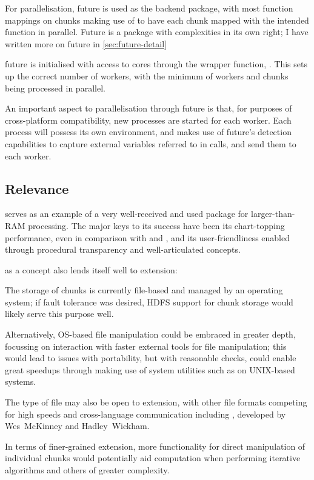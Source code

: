 For parallelisation, future is used as the backend package, with most function mappings on chunks making use of  to have each chunk mapped with the intended function in parallel.
Future is a package with complexities in its own right; I have written more on future in \cref{sec:future-detail}

future is initialised with access to cores through the wrapper function, \cite{zj19:_key}.
This sets up the correct number of workers, with the minimum of workers and chunks being processed in parallel.

An important aspect to parallelisation through future is that, for purposes of cross-platform compatibility, new \R{} processes are started for each worker\cite{zj19:_using}.
Each process will possess its own environment, and  makes use of future's detection capabilities to capture external variables referred to in calls, and send them to each worker.

\subsection{Relevance}\label{sec:relevance}

 serves as an example of a very well-received and used package
for larger-than-RAM processing.
The major keys to its success have been its chart-topping performance, even in comparison with  and , and its user-friendliness enabled through procedural transparency and well-articulated concepts.

 as a concept also lends itself well to extension:

The storage of chunks is currently file-based and managed by an operating system; if fault tolerance was desired, HDFS support for chunk storage would likely serve this purpose well.

Alternatively, OS-based file manipulation could be embraced in greater depth, focussing on interaction with faster external tools for file manipulation; this would lead to issues with portability, but with reasonable checks, could enable great speedups through making use of system utilities such as  on UNIX-based systems.

The type of file may also be open to extension, with other file formats competing for high speeds and cross-language communication including , developed by Wes~McKinney and Hadley~Wickham\cite{wes16}.

In terms of finer-grained extension, more functionality for direct manipulation of individual chunks would potentially aid computation when performing iterative algorithms and others of greater complexity.
